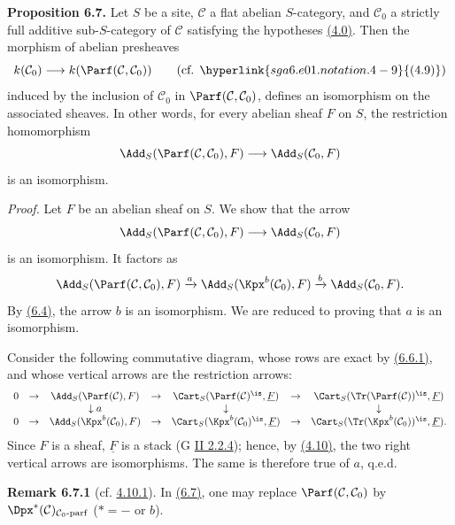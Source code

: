 \textbf{Proposition 6.7.} Let \(S\) be a site, \(\mathcal C\) a flat abelian \(S\)-category, and \(\mathcal C_0\) a strictly full additive sub-\(S\)-category of \(\mathcal C\) satisfying the hypotheses \hyperlink{sga6.e01.para.4-0}{(4.0)}. Then the morphism of abelian presheaves
\[
  k(\mathcal C_0)\longrightarrow k(\Parf(\mathcal C,\mathcal C_0))\qquad(\text{cf. }\hyperlink{sga6.e01.notation.4-9}{(4.9)})
\]
induced by the inclusion of \(\mathcal C_0\) in \(\Parf(\mathcal C,\mathcal C_0)\), defines an isomorphism on the associated sheaves. In other words, for every abelian sheaf \(F\) on \(S\), the restriction homomorphism
\[
  \Add_S(\Parf(\mathcal C,\mathcal C_0),F)
  \longrightarrow
  \Add_S(\mathcal C_0,F)
\]
is an isomorphism.

\emph{Proof.} Let \(F\) be an abelian sheaf on \(S\). We show that the arrow
\[
  \Add_S(\Parf(\mathcal C,\mathcal C_0),F)
  \longrightarrow
  \Add_S(\mathcal C_0,F)
\]
is an isomorphism. It factors as
\[
\Add_S(\Parf(\mathcal C,\mathcal C_0),F)
 \xrightarrow{a}
\Add_S(\Kpx^b(\mathcal C_0),F)
 \xrightarrow{b}
\Add_S(\mathcal C_0,F).
\]
By \hyperlink{sga6.e01.lem.6-4}{(6.4)}, the arrow \(b\) is an isomorphism. We are reduced to proving that \(a\) is an isomorphism.

Consider the following commutative diagram, whose rows are exact by \hyperlink{sga6.e01.eq.6-6-1}{(6.6.1)}, and whose vertical arrows are the restriction arrows:
\[
\begin{array}{ccccccccc}
0&\to&\Add_S(\Parf(\mathcal C),F)&\to&\Cart_S(\Parf(\mathcal C)^{\is},\underline F)&\to&\Cart_S(\Tr(\Parf(\mathcal C))^{\is},\underline F)\\
&&\downarrow a&&\downarrow&&\downarrow\\
0&\to&\Add_S(\Kpx^b(\mathcal C_0),F)&\to&\Cart_S(\Kpx^b(\mathcal C_0)^{\is},\underline F)&\to&\Cart_S(\Tr(\Kpx^b(\mathcal C_0))^{\is},\underline F).
\end{array}
\]
Since \(F\) is a sheaf, \(\underline F\) is a stack (G \hyperlink{sga6.e02.def.2-2-4}{II 2.2.4}); hence, by \hyperlink{sga6.e01.prop.4-10}{(4.10)}, the two right vertical arrows are isomorphisms. The same is therefore true of \(a\), q.e.d.

\textbf{Remark 6.7.1} (cf. \hyperlink{sga6.e01.rem.4-10-1}{4.10.1}). In \hyperlink{sga6.e01.prop.6-7}{(6.7)}, one may replace \(\Parf(\mathcal C,\mathcal C_0)\) by \(\Dpx^*(\mathcal C)_{\mathcal C_0\text{-}\mathrm{parf}}\) (\(*=-\) or \(b\)).

